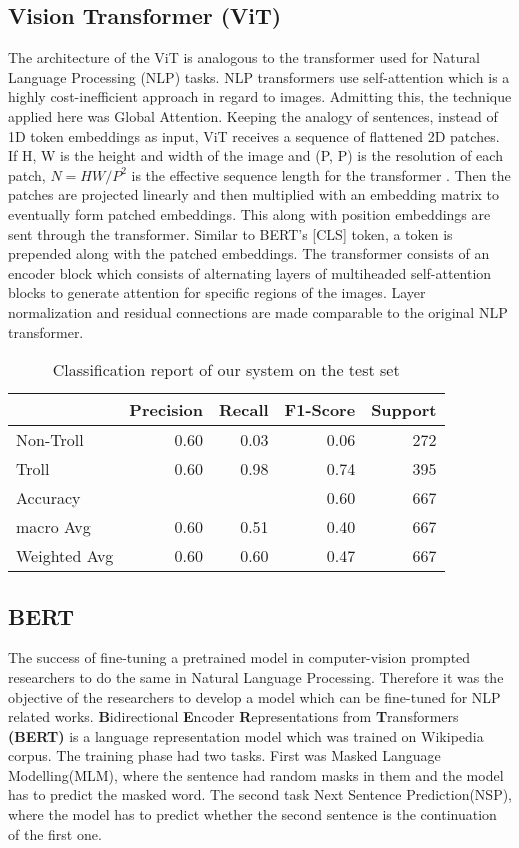\documentclass[11pt,a4paper]{article}
\begin{document}
\subsection{Vision Transformer (ViT)}
\label{ViT}
The architecture of the ViT is analogous to the transformer used for Natural Language Processing (NLP) tasks. NLP transformers use self-attention which is a highly cost-inefficient approach in regard to images. Admitting this, the technique applied here was Global Attention. Keeping the analogy of sentences, instead of 1D token embeddings as input, ViT receives a sequence of flattened 2D patches. If H, W is the height and width of the image and (P, P) is the resolution of each patch, \(N=HW/P^2\) is the effective sequence length for the transformer \cite{dosovitskiy2021an}. Then the patches are projected linearly and then multiplied with an embedding matrix to eventually form patched embeddings. This along with position embeddings are sent through the transformer. Similar to BERT's [CLS] token, a token is prepended along with the patched embeddings. The transformer consists of an encoder block which consists of alternating layers of multiheaded self-attention blocks to generate attention for specific regions of the images. Layer normalization and residual connections are made comparable to the original NLP transformer.

\begin{table*}[!h]
\centering
\begin{tabular}{l|r|r|r|r}
\hline
 & Precision & Recall & F1-Score & Support\\
\hline
Non-Troll & 0.60 & 0.03 & 0.06 & 272\\
Troll & 0.60 & 0.98 & 0.74 & 395\\ 
\hline 
Accuracy & & & 0.60 & 667\\
macro Avg & 0.60 & 0.51 & 0.40 & 667 \\
Weighted Avg & 0.60 & 0.60 & 0.47 & 667\\
\hline
\end{tabular}
\caption{Classification report of our system on the test set}\label{tab4}
\end{table*}
\subsection{BERT}
\label{bert}
The success of fine-tuning a pretrained model in computer-vision prompted researchers to do the same in Natural Language Processing. Therefore it was the objective of the researchers to develop a model which can be fine-tuned for NLP related works. \textbf{B}idirectional \textbf{E}ncoder \textbf{R}epresentations from \textbf{T}ransformers \textbf{(BERT)} \cite{devlin-etal-2019-bert} is a language representation model which was trained on Wikipedia corpus. The training phase had two tasks. First was Masked Language Modelling(MLM), where the sentence had random masks in them and the model has to predict the masked word. The second task Next Sentence Prediction(NSP), where the model has to predict whether the second sentence is the continuation of the first one. 
\end{document}
